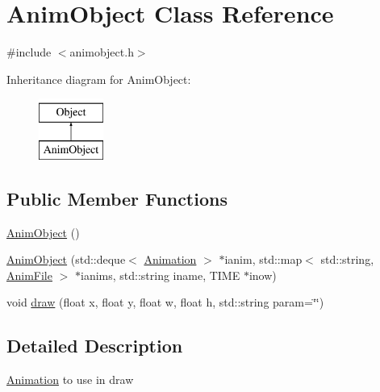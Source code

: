 \hypertarget{class_anim_object}{\section{Anim\-Object Class Reference}
\label{class_anim_object}
}


{\ttfamily \#include $<$animobject.\-h$>$}

Inheritance diagram for Anim\-Object\-:\begin{figure}[H]
\begin{center}
\leavevmode
\includegraphics[height=2.000000cm]{class_anim_object}
\end{center}
\end{figure}
\subsection*{Public Member Functions}
\begin{DoxyCompactItemize}
\item 
\hyperlink{class_anim_object_a05d32294cceb9b869d5b4088c430f08b}{Anim\-Object} ()
\item 
\hyperlink{class_anim_object_a6f0092d3c69a4b3af920dd68eab73449}{Anim\-Object} (std\-::deque$<$ \hyperlink{class_animation}{Animation} $>$ $\ast$ianim, std\-::map$<$ std\-::string, \hyperlink{class_anim_file}{Anim\-File} $>$ $\ast$ianims, std\-::string iname, T\-I\-M\-E $\ast$inow)
\item 
void \hyperlink{class_anim_object_a93eda4562497de04bf7db6407d74e5aa}{draw} (float x, float y, float w, float h, std\-::string param=\char`\"{}\char`\"{})
\end{DoxyCompactItemize}


\subsection{Detailed Description}
\hyperlink{class_animation}{Animation} to use in draw 

